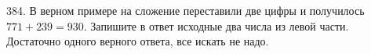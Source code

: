 384. В верном примере на сложение переставили две цифры и получилось $771+239=930.$ Запишите в ответ исходные два числа из левой части. Достаточно одного верного ответа, все искать не надо.\\
